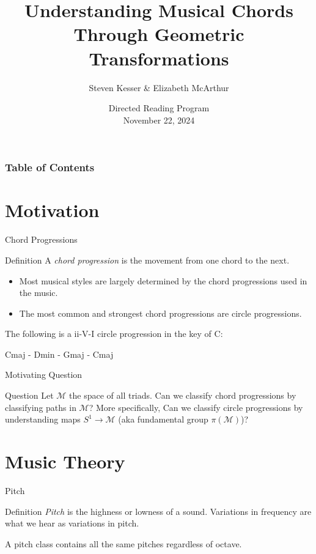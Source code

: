 \documentclass{beamer}
\title[Understanding Musical Chords Through Geometric Transformations] %
{Understanding Musical Chords Through Geometric Transformations}
\author %
{Steven Kesser \& Elizabeth McArthur}
\institute[] %
{
  University of Georgia \\ Advised By: \\Cameron Thomas 
}
\date[April 28, 2022] %
{Directed Reading Program\\ November 22, 2024}
\begin{document}
\frame{\titlepage}

\begin{frame}
\frametitle{Table of Contents}
\tableofcontents
\end{frame}

\section{Motivation}

\begin{frame}{Chord Progressions}
\begin{block}{Definition}
     A \textit{chord progression} is the movement from one chord to the next.
\end{block}

\begin{itemize}
    \item Most musical styles are largely determined by the chord progressions used in the music.
    \item The most common and strongest chord progressions are circle progressions.
\end{itemize}

\begin{Example}
    The following is a ii-V-I circle progression in the key of C:
    \begin{center}
        Cmaj - Dmin - Gmaj - Cmaj
    \end{center}
\end{Example}
\end{frame}

\begin{frame}{Motivating Question}

\begin{alertblock}{Question}
     Let $\mathcal{M}$ the space of all triads. Can we classify chord progressions by classifying paths in $\mathcal{M}$? More specifically, Can we classify circle progressions by understanding maps $S^1 \longrightarrow \mathcal{M}$ (aka fundamental group $\pi(\mathcal{M})$)?
\end{alertblock}
\end{frame}

\section{Music Theory}
\begin{frame}{Pitch}
    \begin{block}{Definition}
     \textit{Pitch} is the highness or lowness of a sound. Variations in frequency are what we hear as
     variations in pitch. 
    \end{block}
 \begin{Definition} 
A pitch class contains all the same pitches regardless of octave.
 \end{Definition}

\end{frame}
\end{document}
